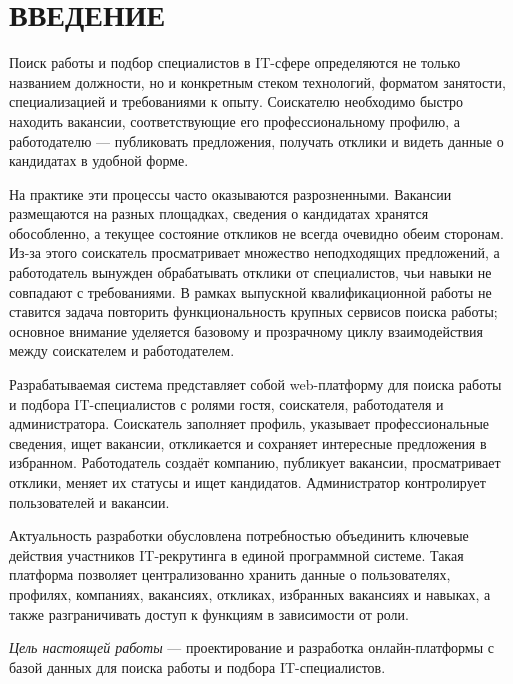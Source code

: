 \section*{ВВЕДЕНИЕ}

Поиск работы и подбор специалистов в IT-сфере определяются не только названием должности, но и конкретным стеком технологий, форматом занятости, специализацией и требованиями к опыту. Соискателю необходимо быстро находить вакансии, соответствующие его профессиональному профилю, а работодателю — публиковать предложения, получать отклики и видеть данные о кандидатах в удобной форме.

На практике эти процессы часто оказываются разрозненными. Вакансии размещаются на разных площадках, сведения о кандидатах хранятся обособленно, а текущее состояние откликов не всегда очевидно обеим сторонам. Из-за этого соискатель просматривает множество неподходящих предложений, а работодатель вынужден обрабатывать отклики от специалистов, чьи навыки не совпадают с требованиями. В рамках выпускной квалификационной работы не ставится задача повторить функциональность крупных сервисов поиска работы; основное внимание уделяется базовому и прозрачному циклу взаимодействия между соискателем и работодателем.

Разрабатываемая система представляет собой web-платформу для поиска работы и подбора IT-специалистов с ролями гостя, соискателя, работодателя и администратора. Соискатель заполняет профиль, указывает профессиональные сведения, ищет вакансии, откликается и сохраняет интересные предложения в избранном. Работодатель создаёт компанию, публикует вакансии, просматривает отклики, меняет их статусы и ищет кандидатов. Администратор контролирует пользователей и вакансии.

Актуальность разработки обусловлена потребностью объединить ключевые действия участников IT-рекрутинга в единой программной системе. Такая платформа позволяет централизованно хранить данные о пользователях, профилях, компаниях, вакансиях, откликах, избранных вакансиях и навыках, а также разграничивать доступ к функциям в зависимости от роли.

\emph{Цель настоящей работы} — проектирование и разработка онлайн-платформы с базой данных для поиска работы и подбора IT-специалистов.

